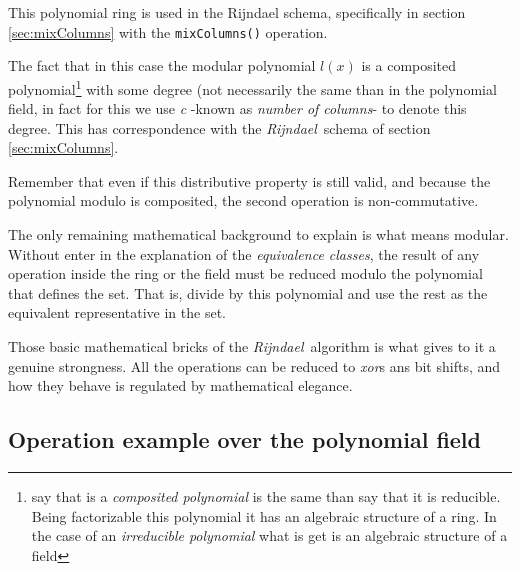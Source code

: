 \documentclass[10pt,a4paper,twoside]{llncs}
\newcommand{\todo}[1]{\texttt{\color{red}TODO:} ``\emph{#1}''}
\newcommand{\rijndael}{\emph{Rijndael}}
\begin{document}
This polynomial ring is used in the Rijndael schema, specifically in section \ref{sec:mixColumns} with the {\tt mixColumns()} operation.

The fact that in this case the modular polynomial $l(x)$ is a composited polynomial\footnote{say that is a \emph{composited polynomial} is the same than say that it is reducible. Being factorizable this polynomial it has an algebraic structure of a ring. In the case of an \emph{irreducible polynomial} what is get is an algebraic structure of a field} with some degree (not necessarily the same than in the polynomial field, in fact for this we use \emph{c} -known as \emph{number of columns}- to denote this degree. This has correspondence with the \rijndael\, schema of section \ref{sec:mixColumns}.

Remember that even if this distributive property is still valid, and because the polynomial modulo is composited, the second operation is non-commutative.

The only remaining mathematical background to explain is what means modular. Without enter in the explanation of the \emph{equivalence classes}, the result of any operation inside the ring or the field must be reduced modulo the polynomial that defines the set. That is, divide by this polynomial and use the rest as the equivalent representative in the set.

Those basic mathematical bricks of the \rijndael\, algorithm is what gives to it a genuine strongness. All the operations can be reduced to \emph{xor}s ans bit shifts, and how they behave is regulated by mathematical elegance. 

\subsection{Operation example over the polynomial field}\label{sec:polynomialField}

\end{document}
